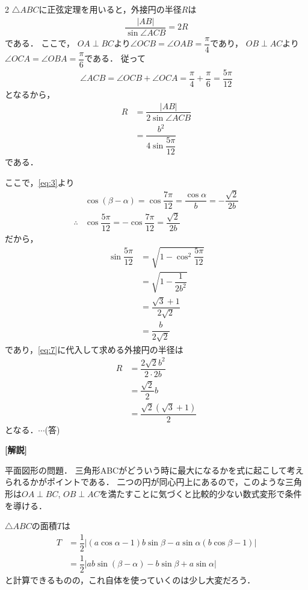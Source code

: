 \documentclass[../../main.tex]{subfiles}
\begin{document}
\begin{multicols}{2}
  $\triangle ABC$に正弦定理を用いると，外接円の半径$R$は
  \begin{align}
    \dfrac{|AB|}{\sin\angle ACB} = 2R
  \end{align}
  である．
  ここで，
  $OA\perp BC$より$\angle OCB = \angle OAB=\dfrac{\pi}{4}$であり，
  $OB\perp AC$より$\angle OCA = \angle OBA=\dfrac{\pi}{6}$である．
  従って
  \begin{align}
    \angle ACB= \angle OCB + \angle OCA = \dfrac{\pi}{4} + \dfrac{\pi}{6}=\dfrac{5\pi}{12}
  \end{align}
  となるから，
  \begin{align}
    R
    & = \dfrac{|AB|}{2\sin\angle ACB}                         \\
    & = \dfrac{b^2}{4\sin\dfrac{5\pi}{12}} \label{eq:7}
  \end{align}
  である．

  ここで，\cref{eq:3}より
  \begin{align}
    & \cos\left(\beta-\alpha\right) = \cos\dfrac{7\pi}{12} = \dfrac{\cos\alpha}{b} = -\dfrac{\sqrt{2}}{2b} \\
    \therefore
    & \cos\dfrac{5\pi}{12} = -\cos\dfrac{7\pi}{12} = \dfrac{\sqrt{2}}{2b}
  \end{align}
  だから，
  \begin{align}
    \sin\dfrac{5\pi}{12}
    & = \sqrt{1-\cos^2\dfrac{5\pi}{12}} \\
    & = \sqrt{1-\dfrac{1}{2b^2}}        \\
    & = \dfrac{\sqrt{3}+1}{2\sqrt{2}}   \\
    & = \dfrac{b}{2\sqrt{2}}
  \end{align}
  であり，\cref{eq:7}に代入して求める外接円の半径は
  \begin{align}
    R
    & = \dfrac{2\sqrt{2}b^2}{2 \cdot 2b} \\
    & = \dfrac{\sqrt{2}}{2}b             \\
    & = \dfrac{\sqrt{2}(\sqrt{3}+1)}{2}
  \end{align}
  となる．$\cdots$(答)

  {\bf [解説]}

  平面図形の問題．
  三角形ABCがどういう時に最大になるかを式に起こして考えられるかがポイントである．
  二つの円が同心円上にあるので，このような三角形は$OA \perp BC$, $OB \perp AC$を満たすことに気づくと比較的少ない数式変形で条件を導ける．

  $\triangle ABC$の面積$T$は
  \begin{align}
    T
    & = \dfrac{1}{2} \left| (a\cos\alpha-1)b\sin\beta - a\sin\alpha(b\cos\beta-1) \right| \\
    & = \dfrac{1}{2} \left| ab\sin(\beta-\alpha) - b\sin\beta + a\sin\alpha \right|
  \end{align}
  と計算できるものの，これ自体を使っていくのは少し大変だろう．


\end{multicols}
\end{document}
